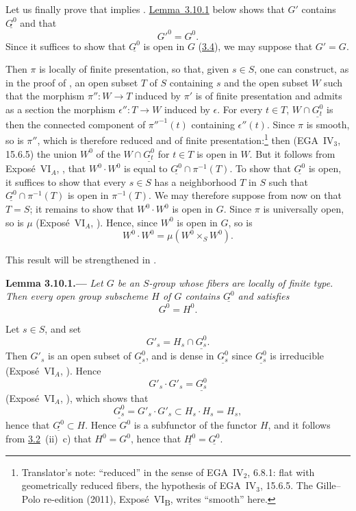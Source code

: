 Let us finally prove that \textup{} implies \textup{}.
\hyperref[lem:sga3-VIB-3.10.1]{Lemma~3.10.1} below shows that \(G'\) contains \(\underline{G^0}\) and that
\[
  G'^0=G^0.
\]
Since it suffices to show that \(\underline{G^0}\) is open in \(G\)
(\hyperref[case:sga3-VIB-3.4]{3.4}), we may suppose that \(G'=G\).

Then \(\pi\) is locally of finite presentation, so that, given \(s\in S\),
one can construct, as in the proof of , an open subset \(T\) of
\(S\) containing \(s\) and the open subset \(W\) such that the morphism
\(\pi'':W\to T\) induced by \(\pi'\) is of finite presentation and admits
as a section the morphism \(\epsilon'':T\to W\) induced by \(\epsilon\).
For every \(t\in T\), \(W\cap\underline{G_t^0}\) is then the connected
component of \(\pi''^{-1}(t)\) containing \(\epsilon''(t)\). Since \(\pi\) is
smooth, so is \(\pi''\), which is therefore reduced and of finite
presentation:\footnote{Translator's note: ``reduced'' in the sense of EGA~IV\(_2\), 6.8.1: flat with
geometrically reduced fibers, the hypothesis of EGA~IV\(_3\), 15.6.5. The Gille--Polo re-edition (2011),
Expos\'e~VI\textsubscript{B}, writes ``smooth'' here.} then (EGA~IV\(_3\), 15.6.5) the union \(W^0\) of the
\(W\cap\underline{G_t^0}\) for \(t\in T\) is open in \(W\). But it follows
from Expos\'e~VI\(_A\), , that \(W^0\cdot W^0\) is equal to
\(\underline{G^0}\cap\pi^{-1}(T)\). To show that \(\underline{G^0}\) is open, it
suffices to show that every \(s\in S\) has a neighborhood \(T\) in \(S\)
such that \(\underline{G^0}\cap\pi^{-1}(T)\) is open in \(\pi^{-1}(T)\). We may
therefore suppose from now on that \(T=S\); it remains to show that
\(W^0\cdot W^0\) is open in \(G\). Since \(\pi\) is universally open, so is
\(\mu\) (Expos\'e~VI\(_A\), ). Hence, since \(W^0\) is open in \(G\), so is
\[
  W^0\cdot W^0=\mu(W^0\times_S W^0).
\]

This result will be strengthened in .

\medskip
{}\label{lem:sga3-VIB-3.10.1}%
\noindent\textbf{Lemma 3.10.1.---}
\emph{Let \(G\) be an \(S\)-group whose fibers are locally of
finite type. Then every open group subscheme \(H\) of \(G\) contains
\(\underline{G^0}\) and satisfies}
\[
  G^0=H^0.
\]

Let \(s\in S\), and set
\[
  G'_s=H_s\cap\underline{G_s^0}.
\]
Then \(G'_s\) is an open subset of \(\underline{G_s^0}\), and is dense in
\(\underline{G_s^0}\) since \(\underline{G_s^0}\) is irreducible
(Expos\'e~VI\(_A\), ). Hence
\[
  G'_s\cdot G'_s=\underline{G_s^0}
\]
(Expos\'e~VI\(_A\), ), which shows that
\[
  \underline{G_s^0}=G'_s\cdot G'_s\subset H_s\cdot H_s=H_s,
\]
hence that \(\underline{G^0}\subset H\). Hence \(G^0\) is a subfunctor of the
functor \(H\), and it follows from \hyperref[rem:sga3-VIB-3.2]{3.2}~(ii)~c) that \(H^0=G^0\), hence
that \(\underline{H^0}=\underline{G^0}\).

